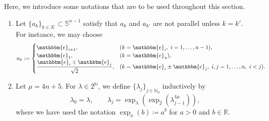 \documentclass[a4paper,12pt,reqno]{amsart}
\theoremstyle{plain}
\theoremstyle{definition}
\newcommand{\N}{\mathbb{N}}
\newcommand{\bb}{\mathbbm}
\begin{document}
Here, we introduce some notations that are to be used throughout this section.
\begin{enumerate}[label=\arabic*.]
\item 
Let $\{ a_k \}_{k \in \mathcal{K}} \subset \mathbb{S}^{n-1}$ satisfy that $a_k$ and $a_{k'}$ are not parallel unless $k = k'$.
For instance, we may choose
\begin{align}
    a_k
    :=
    \begin{cases}
        \bb{e}_{i+1}, & (k=\bb{e}_i,\ i=1,\dots,n-1), \\
        \bb{e}_1, & (k=\bb{e}_n), \\
        \dfrac{\bb{e}_i \mp \bb{e}_j}{\sqrt{2}}, & (k=\bb{e}_i \pm \bb{e}_j,\ i,j=1,\dots,n,\ i < j).
    \end{cases}
\end{align}
\item 
Let $\mu=4n+5$.
For $\lambda\in 2^{\mathbb{N}}$, we define $\{\lambda_j\}_{j\in\N_0}$ inductively by
\begin{equation}\label{eq:def-lambdaj}
  \lambda_0=\lambda,
  \qquad
  \lambda_j=\exp_{\lambda}\!\left(\exp_2\!\left(\lambda_{j-1}^{4\mu}\right)\right),
\end{equation}
where we have used the notation $\exp_a(b)\coloneqq a^b$ for $a>0$ and $b\in\mathbb{R}$.


\end{enumerate}
\end{document}
